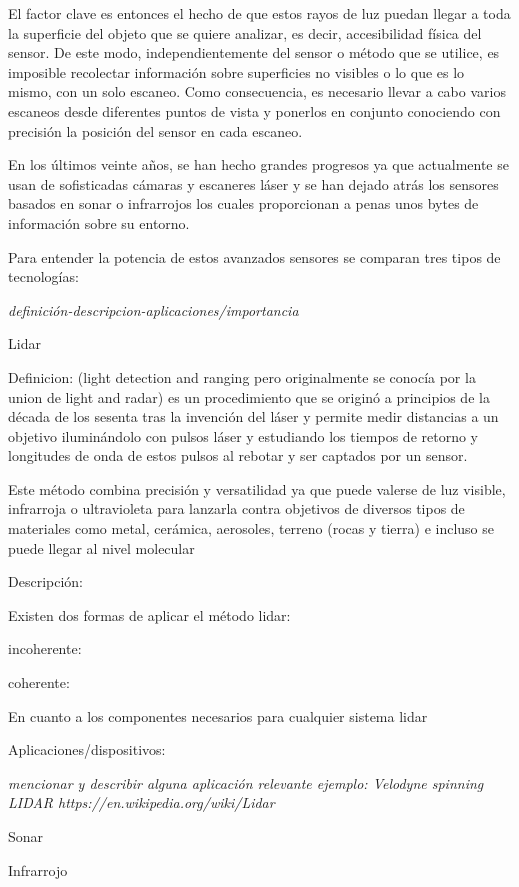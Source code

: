 El factor clave es entonces el hecho de que estos rayos de luz puedan llegar a toda la superficie del objeto
que se quiere analizar, es decir, accesibilidad física del sensor.
De este modo, independientemente del sensor o método que se utilice, es imposible recolectar
información sobre superficies no visibles o lo que es lo mismo, con un solo escaneo.
Como consecuencia, es necesario llevar a cabo varios escaneos desde diferentes puntos de vista y
ponerlos en conjunto conociendo con precisión la posición del sensor en cada escaneo.

En los últimos veinte años, se han hecho grandes progresos ya que actualmente se usan de sofisticadas cámaras y escaneres láser y se han dejado atrás los sensores basados en sonar o infrarrojos los cuales proporcionan a penas unos bytes de información sobre su entorno.

Para entender la potencia de estos avanzados sensores se comparan tres tipos de tecnologías: 

\textit{definición-descripcion-aplicaciones/importancia}

\begin{list}{-}
\item Lidar

Definicion:
(light detection and ranging pero originalmente se conocía por la union de light and radar)
es un procedimiento que se originó a principios de la década de los sesenta tras la invención del láser y permite medir distancias a un objetivo iluminándolo con pulsos láser y estudiando los tiempos de retorno y longitudes de onda de estos pulsos al rebotar y ser captados por un sensor.

Este método combina precisión y versatilidad ya que puede valerse de luz visible, infrarroja o ultravioleta para lanzarla contra objetivos de diversos tipos de materiales como metal, cerámica, aerosoles, terreno (rocas y tierra) e incluso se puede llegar al nivel molecular

Descripción:

Existen dos formas de aplicar el método lidar:
\begin{list}{•}
\item incoherente: 
\item coherente:
\end{list}

En cuanto a los componentes necesarios para cualquier sistema lidar 

Aplicaciones/dispositivos:

\textit{mencionar y describir alguna aplicación relevante ejemplo: Velodyne spinning LIDAR https://en.wikipedia.org/wiki/Lidar}

\item Sonar
\item Infrarrojo
\end{list}

